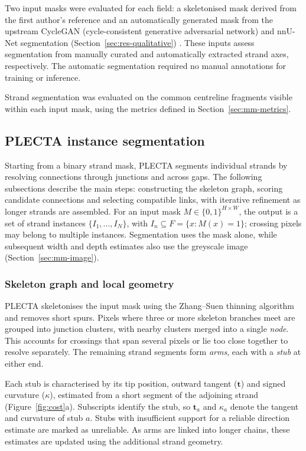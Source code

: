Two input masks were evaluated for each field: a skeletonised mask derived
from the first author's reference and an automatically generated mask from the
upstream CycleGAN (cycle-consistent generative adversarial network) and
nnU-Net segmentation (Section~\ref{sec:res-qualitative})
\citep{ruehle2021workflow,isensee2021nnunet}. These inputs assess segmentation
from manually curated and automatically extracted strand axes, respectively.
The automatic segmentation required no manual annotations for training or
inference.

Strand segmentation was evaluated on the common centreline fragments
visible within each input mask,
using the metrics defined in Section~\ref{sec:mm-metrics}.


\subsection{PLECTA instance segmentation}
\label{sec:mm-plecta}

Starting from a binary strand mask, PLECTA segments individual strands by
resolving connections through junctions and across gaps. The following
subsections describe the main steps: constructing the skeleton graph, scoring
candidate connections and selecting compatible links, with iterative
refinement as longer strands are assembled. For an input mask
$M\in\{0,1\}^{H\times W}$, the output is a set of strand instances
$\{I_1,\ldots,I_N\}$, with $I_n\subseteq F=\{x:M(x)=1\}$; crossing pixels
may belong to multiple instances. Segmentation uses the mask alone, while
subsequent width and depth estimates also use the greyscale image
(Section~\ref{sec:mm-image}).

\subsubsection{Skeleton graph and local geometry}
\label{sec:mm-graph}

PLECTA skeletonises the input mask using the Zhang--Suen thinning algorithm
\citep{zhang1984thinning} and removes short spurs. Pixels where three or more
skeleton branches meet are grouped into junction clusters, with nearby
clusters merged into a single \emph{node}. This accounts for crossings that
span several pixels or lie too close together to resolve separately. The
remaining strand segments form \emph{arms}, each with a \emph{stub} at either
end.

Each stub is characterised by its tip position, outward tangent
($\mathbf{t}$) and signed curvature ($\kappa$), estimated from a short segment
of the adjoining strand (Figure~\ref{fig:cost}a). Subscripts identify the stub,
so $\mathbf{t}_a$ and $\kappa_a$ denote the tangent and curvature of stub $a$.
Stubs with insufficient support for a reliable direction estimate are marked
as unreliable. As arms are linked into longer chains, these estimates are
updated using the additional strand geometry.

